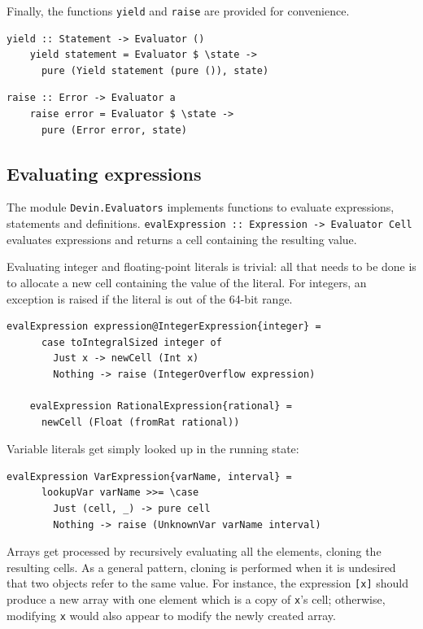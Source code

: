 \documentclass[UdineBachThesis,american,11pt]{PhdThesis}
\begin{document}
  Finally, the functions \mbox{\texttt{yield}} and \mbox{\texttt{raise}} are
  provided for convenience.

  \begin{Verbatim}[gobble=4,fontsize=\small]
    yield :: Statement -> Evaluator ()
    yield statement = Evaluator $ \state ->
      pure (Yield statement (pure ()), state)
  \end{Verbatim}

  \pagebreak

  \begin{Verbatim}[gobble=4,fontsize=\small]
    raise :: Error -> Evaluator a
    raise error = Evaluator $ \state ->
      pure (Error error, state)
  \end{Verbatim}

  \subsection{Evaluating expressions}

  The module \mbox{\texttt{Devin.Evaluators}} implements functions to evaluate
  expressions, statements and definitions.
  \mbox{\texttt{evalExpression :: Expression -> Evaluator Cell}} evaluates
  expressions and returns a cell containing the resulting value.

  Evaluating integer and floating-point literals is trivial: all that needs to
  be done is to allocate a new cell containing the value of the literal. For
  integers, an exception is raised if the literal is out of the 64-bit range.

  \begin{Verbatim}[gobble=4,fontsize=\small]
    evalExpression expression@IntegerExpression{integer} =
      case toIntegralSized integer of
        Just x -> newCell (Int x)
        Nothing -> raise (IntegerOverflow expression)

    evalExpression RationalExpression{rational} =
      newCell (Float (fromRat rational))
  \end{Verbatim}

  Variable literals get simply looked up in the running state:

  \begin{Verbatim}[gobble=4,fontsize=\small]
    evalExpression VarExpression{varName, interval} =
      lookupVar varName >>= \case
        Just (cell, _) -> pure cell
        Nothing -> raise (UnknownVar varName interval)
  \end{Verbatim}

  Arrays get processed by recursively evaluating all the elements, cloning the
  resulting cells. As a general pattern, cloning is performed when it is
  undesired that two objects refer to the same value. For instance, the
  expression \mbox{\texttt{[x]}} should produce a new array with one element
  which is a copy of \texttt{x}'s cell; otherwise, modifying \texttt{x} would
  also appear to modify the newly created array.
\end{document}
